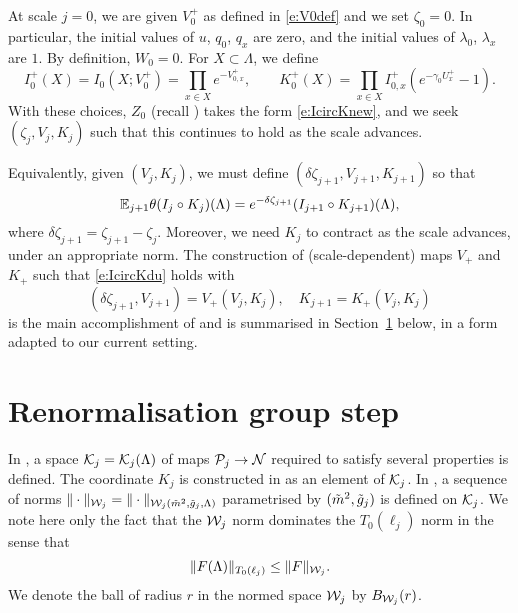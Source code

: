 At scale $j = 0$, we are given $V^+_0$ as defined in \eqref{e:V0def}
and we set $\zeta_0 = 0$. In particular,
the initial values of $u$, $q_0$, $q_x$ are zero, and the initial values of $\lambda_0$, $\lambda_x$
are $1$. By definition, $W_0 = 0$.
For $X \subset \Lambda$, we define
\begin{equation}
\label{e:IK0def}
I_0^+(X) = I_0(X; V^+_0) = \prod_{x\in X} e^{-V^+_{0,x}},
	\qquad
K_0^+(X) = \prod_{x \in X} I_{0,x}^+ (e^{-\gamma_0 U^{+}_{x}} - 1).
\end{equation}
With these choices, $Z_0$ (recall )
takes the form \eqref{e:IcircKnew}, and we seek $(\zeta_j, V_j, K_j)$ such that
this continues to hold as the scale advances.

Equivalently, given $(V_j, K_j)$, we must define $(\delta\zeta_{j+1}, V_{j+1}, K_{j+1})$ so that
\begin{equation} \label{e:IcircKdu}
	\mathbb{E}_{j+1}\theta(I_j \circ K_j)(\Lambda)
	=
	e^{-\delta \zeta_{j+1}}(I_{j+1} \circ K_{j+1})(\Lambda),
\end{equation}
where $\delta\zeta_{j+1} = \zeta_{j+1} - \zeta_j$.
Moreover, we need $K_j$ to contract as the scale advances, under an appropriate norm.
The construction of (scale-dependent) maps $V_+$ and $K_+$ such that
\eqref{e:IcircKdu} holds with
\begin{equation}
(\delta\zeta_{j+1}, V_{j+1}) = V_+(V_j, K_j),
	\quad
K_{j+1} =  K_+(V_j, K_j)
\end{equation}
is the main accomplishment of \cite{BS-rg-step} and is summarised in Section~\ref{sec:step}
below, in a form adapted to our current setting.


\section{Renormalisation group step}
\label{sec:step}

In \cite[Definition~\ref{step-def:Kspace}]{BS-rg-step},
a space $\mathcal{K}_j = \mathcal{K}_j(\Lambda)$ of maps $\mathcal{P}_j \rightarrow \mathcal{N}$ required to satisfy
several properties is defined.
The coordinate $K_j$ is constructed in \cite{BS-rg-step} as an element of $\mathcal{K}_j$.
In \cite[Section~\ref{step-sec:Knorms}]{BS-rg-step},
a sequence of norms $\|\cdot\|_{\mathcal{W}_j} = \|\cdot\|_{\mathcal{W}_j(\tilde{m}^2, \tilde{g}_j, \Lambda)}$
parametrised by $(\tilde{m}^2, \tilde{g}_j)$ is defined on $\mathcal{K}_j$.
We note here only the fact that the $\mathcal{W}_j$ norm dominates the $T_0(\ell_j)$ norm
in the sense that
\begin{equation}
\label{e:T0dom}
\|F(\Lambda)\|_{T_0(\ell_j)} \le \|F\|_{\mathcal{W}_j}.
\end{equation}
We denote the ball of radius $r$ in the normed space $\mathcal{W}_j$ by $B_{\mathcal{W}_j}(r)$.

